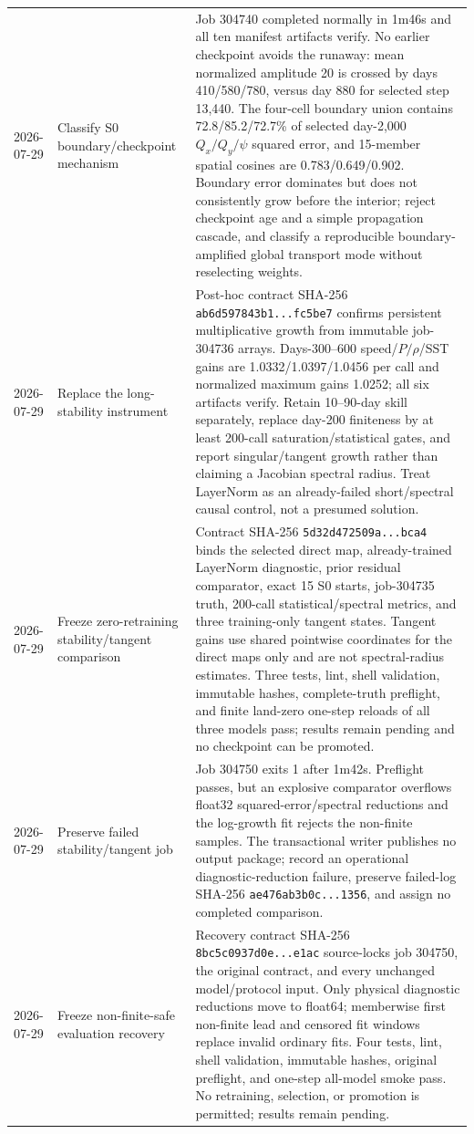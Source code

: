 \documentclass[11pt]{article}
\begin{document}
\begin{longtable}{@{}p{}p{}p{}@{}}
2026-07-29 & Classify S0 boundary/checkpoint mechanism & Job 304740 completed normally in 1m46s and all ten manifest artifacts verify.  No earlier checkpoint avoids the runaway: mean normalized amplitude 20 is crossed by days 410/580/780, versus day 880 for selected step 13,440.  The four-cell boundary union contains 72.8/85.2/72.7\% of selected day-2,000 \(Q_x/Q_y/\psi\) squared error, and 15-member spatial cosines are 0.783/0.649/0.902.  Boundary error dominates but does not consistently grow before the interior; reject checkpoint age and a simple propagation cascade, and classify a reproducible boundary-amplified global transport mode without reselecting weights. \\
2026-07-29 & Replace the long-stability instrument & Post-hoc contract SHA-256 \texttt{ab6d597843b1...fc5be7} confirms persistent multiplicative growth from immutable job-304736 arrays.  Days-300--600 speed/\(P/\rho\)/SST gains are 1.0332/1.0397/1.0456 per call and normalized maximum gains 1.0252; all six artifacts verify.  Retain 10--90-day skill separately, replace day-200 finiteness by at least 200-call saturation/statistical gates, and report singular/tangent growth rather than claiming a Jacobian spectral radius.  Treat LayerNorm as an already-failed short/spectral causal control, not a presumed solution. \\
2026-07-29 & Freeze zero-retraining stability/tangent comparison & Contract SHA-256 \texttt{5d32d472509a...bca4} binds the selected direct map, already-trained LayerNorm diagnostic, prior residual comparator, exact 15 S0 starts, job-304735 truth, 200-call statistical/spectral metrics, and three training-only tangent states.  Tangent gains use shared pointwise coordinates for the direct maps only and are not spectral-radius estimates.  Three tests, lint, shell validation, immutable hashes, complete-truth preflight, and finite land-zero one-step reloads of all three models pass; results remain pending and no checkpoint can be promoted. \\
2026-07-29 & Preserve failed stability/tangent job & Job 304750 exits 1 after 1m42s.  Preflight passes, but an explosive comparator overflows float32 squared-error/spectral reductions and the log-growth fit rejects the non-finite samples.  The transactional writer publishes no output package; record an operational diagnostic-reduction failure, preserve failed-log SHA-256 \texttt{ae476ab3b0c...1356}, and assign no completed comparison. \\
2026-07-29 & Freeze non-finite-safe evaluation recovery & Recovery contract SHA-256 \texttt{8bc5c0937d0e...e1ac} source-locks job 304750, the original contract, and every unchanged model/protocol input.  Only physical diagnostic reductions move to float64; memberwise first non-finite lead and censored fit windows replace invalid ordinary fits.  Four tests, lint, shell validation, immutable hashes, original preflight, and one-step all-model smoke pass.  No retraining, selection, or promotion is permitted; results remain pending. \\

\end{longtable}
\end{document}
